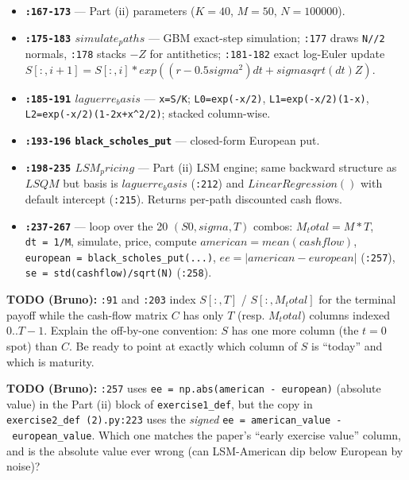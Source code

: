 \documentclass[
  11pt,
]{article}
\begin{document}
\begin{itemize}
\begin{itemize}
    \(exp(-r*dt*t)\) for \(t=1..T\), sum per path, average.
  \item
    \texttt{:156} European price: \(mean(C_european * exp(-r*dt*T))\).
  \end{itemize}
\item
  \textbf{\texttt{:167-173}} --- Part (ii) parameters (\(K=40\),
  \(M=50\), \(N=100000\)).
\item
  \textbf{\texttt{:175-183} \(simulate_paths\)} --- GBM exact-step
  simulation; \texttt{:177} draws \texttt{N//2} normals, \texttt{:178}
  stacks \(-Z\) for antithetics; \texttt{:181-182} exact log-Euler
  update
  \(S[:,i+1] = S[:,i]*exp((r-0.5 sigma^2)dt + sigma sqrt(dt) Z)\).
\item
  \textbf{\texttt{:185-191} \(laguerre_basis\)} --- \texttt{x=S/K};
  \texttt{L0=exp(-x/2)}, \texttt{L1=exp(-x/2)(1-x)},
  \texttt{L2=exp(-x/2)(1-2x+x\^{}2/2)}; stacked column-wise.
\item
  \textbf{\texttt{:193-196} \texttt{black\_scholes\_put}} ---
  closed-form European put.
\item
  \textbf{\texttt{:198-235} \(LSM_pricing\)} --- Part (ii) LSM engine;
  same backward structure as \(LSQM\) but basis is \(laguerre_basis\)
  (\texttt{:212}) and \(LinearRegression()\) with default intercept
  (\texttt{:215}). Returns per-path discounted cash flows.
\item
  \textbf{\texttt{:237-267}} --- loop over the 20 \((S0, sigma, T)\)
  combos: \(M_total = M*T\), \texttt{dt\ =\ 1/M}, simulate, price,
  compute \(american = mean(cashflow)\),
  \texttt{european\ =\ black\_scholes\_put(...)},
  \(ee = |american - european|\) (\texttt{:257}),
  \texttt{se\ =\ std(cashflow)/sqrt(N)} (\texttt{:258}).
\end{itemize}

\textbf{TODO (Bruno):} \texttt{:91} and \texttt{:203} index \(S[:, T]\)
/ \(S[:, M_total]\) for the terminal payoff while the cash-flow matrix
\(C\) has only \(T\) (resp. \(M_total\)) columns indexed \(0..T-1\).
Explain the off-by-one convention: \(S\) has one more column (the
\(t=0\) spot) than \(C\). Be ready to point at exactly which column of
\(S\) is ``today'' and which is maturity.

\textbf{TODO (Bruno):} \texttt{:257} uses
\texttt{ee\ =\ np.abs(american\ -\ european)} (absolute value) in the
Part (ii) block of \texttt{exercise1\_def}, but the copy in
\texttt{exercise2\_def\ (2).py:223} uses the \emph{signed}
\texttt{ee\ =\ american\_value\ -\ european\_value}. Which one matches
the paper's ``early exercise value'' column, and is the absolute value
ever wrong (can LSM-American dip below European by noise)?
\end{document}
